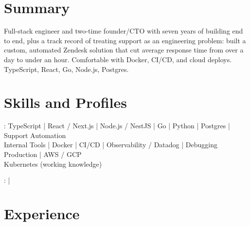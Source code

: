\documentclass[print]{jack-resume}
\begin{document}
\pagecolor{darkmodeBackground}


\begin{minipage}[t][1cm][t]{.03\textwidth}
    \hfill
\end{minipage}

\section{Summary}
Full-stack engineer and two-time founder/CTO with seven years of building end to end, plus a track record of treating support as an engineering problem: built a custom, automated Zendesk solution that cut average response time from over a day to under an hour. Comfortable with Docker, CI/CD, and cloud deploys. TypeScript, React, Go, Node.js, Postgres.
\sectionsep

\section{Skills and Profiles}
:
TypeScript \hfill | \hfill
React / Next.js \hfill | \hfill
Node.js / NestJS \hfill | \hfill
Go \hfill | \hfill
Python \hfill | \hfill
Postgres \hfill | \hfill
Support Automation \\
\hspace{1.0cm} Internal Tools \hfill | \hfill
Docker \hfill | \hfill
CI/CD \hfill | \hfill
Observability / Datadog \hfill | \hfill
Debugging Production \hfill | \hfill
AWS / GCP \\
\hspace{1.0cm} Kubernetes (working knowledge) \\

\raggedright{
    :
      \href{https://www.linkedin.com/in/jack-sturtevant/}{ \ExternalLink} |
     \href{https://github.com/jacksturt}{ \ExternalLink}}

\section{Experience}
\end{document}
